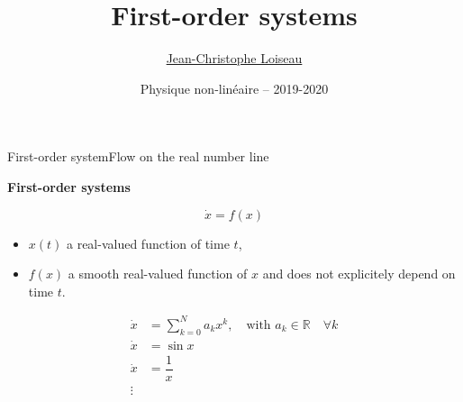 \documentclass[usenames,dvipsnames,svgnames,10pt,aspectratio=169]{beamer}
\title[Nonlinear dynamics] %
{
	First-order systems
}
\author[J.-Ch.~Loiseau] %
{
	\underline{Jean-Christophe Loiseau}
}
\institute[unused]
{
	\url{jean-christophe.loiseau@ensam.eu} \\
	Laboratoire DynFluid \\
	Arts et M\'etiers, France.
}
\date[unused]{Physique non-lin\'eaire -- 2019-2020}
\begin{document}
\titleframe	%


\begin{frame}[t, c]{First-order system}{Flow on the real number line}
  \begin{minipage}{.48\textwidth}
    \begin{block}{\centering \textbf{First-order systems}}

    \[ \dot{x} = f(x) \]
    \end{block}

    \medskip

    \begin{itemize}
    \item $x(t)$ a real-valued function of time $t$,

      \medskip

    \item $f(x)$ a smooth real-valued function of $x$ and does not explicitely depend on time $t$.
    \end{itemize}
  \end{minipage}%
  \hfill
  \begin{minipage}{.48\textwidth}
    \[
    \begin{aligned}
      \dot{x} & = \sum_{k=0}^N a_k x^k, \quad \text{with } a_k \in \mathbb{R} \quad \forall k \\
      \dot{x} & = \sin x \\
      \dot{x} & = \dfrac{1}{x} \\
      \vdots
    \end{aligned}
    \]
  \end{minipage}

  \vspace{1cm}
\end{frame}
\end{document}
